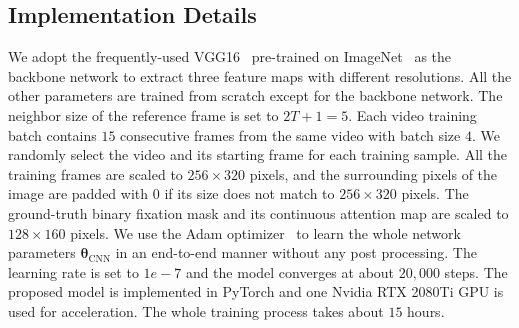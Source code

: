 \documentclass[review]{elsarticle}
\begin{document}
\subsection{Implementation Details}
We adopt the frequently-used VGG16~\cite{simonyan2014very} pre-trained on ImageNet~\cite{krizhevsky2012imagenet} as the backbone network to extract three feature maps with different resolutions.
All the other parameters are trained from scratch except for the backbone network.
The neighbor size of the reference frame is set to $2T+1=5$.
Each video training batch contains $15$ consecutive frames from the same video with batch size $4$.
We randomly select the video and its starting frame for each training sample.
All the training frames are scaled to $256\times320$ pixels, and the surrounding pixels of the image are padded with $0$ if its size does not match to $256\times320$ pixels.
The ground-truth binary fixation mask and its continuous attention map are scaled to $128\times160$ pixels.
We use the Adam optimizer~\cite{kingma2014adam} to learn the whole network parameters $\bm{\theta}_{\mathrm{CNN}}$ in an end-to-end manner without any post processing.
The learning rate is set to $1e-7$ and the model converges at about $20,000$ steps.
The proposed model is implemented in PyTorch and one Nvidia RTX 2080Ti GPU is used for acceleration.
The whole training process takes about $15$ hours.
\end{document}
